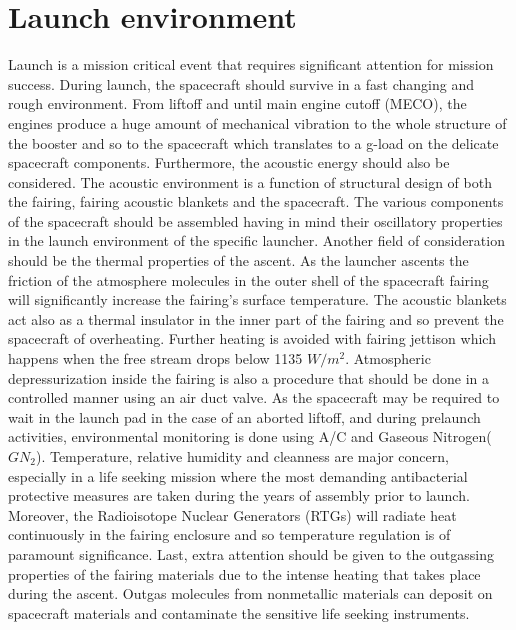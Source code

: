 \section{Launch environment}
Launch is a mission critical event that requires significant attention for mission success. During launch, the spacecraft should survive in a fast changing and rough environment. From liftoff and until main engine cutoff (MECO), the engines produce a huge amount of mechanical vibration to the whole structure of the booster and so to the spacecraft which translates to a g-load on the delicate spacecraft components. 
Furthermore, the acoustic energy should also be considered. The acoustic environment is a function of structural design of both the fairing, fairing acoustic blankets and the spacecraft. The various components of the spacecraft should be assembled having in mind their oscillatory properties in the launch environment of the specific launcher. Another field of consideration should be the thermal properties of the ascent. As the launcher ascents the friction of the atmosphere molecules in the outer shell of the spacecraft fairing will significantly increase the fairing’s surface temperature. The acoustic blankets act also as a thermal insulator in the inner part of the fairing and so prevent the spacecraft of overheating. Further heating is avoided with fairing jettison which happens when the free stream drops below 1135 $W/m^2$\cite{Atlasm}.
Atmospheric depressurization inside the fairing is also a procedure that should be done in a controlled manner using an air duct valve. As the spacecraft may be required to wait in the launch pad in the case of an aborted liftoff, and during prelaunch activities, environmental monitoring is done using A/C and Gaseous Nitrogen($GN_2$). Temperature, relative humidity and cleanness are major concern, especially in a life seeking mission where the most demanding antibacterial protective measures are taken during the years of assembly prior to launch. Moreover, the Radioisotope Nuclear Generators (RTGs) will radiate heat continuously in the fairing enclosure and so temperature regulation is of paramount significance. Last, extra attention should be given to the outgassing properties of the fairing materials due to the intense heating that takes place during the ascent. Outgas molecules from nonmetallic materials can deposit on spacecraft materials and contaminate the sensitive life seeking instruments. 
